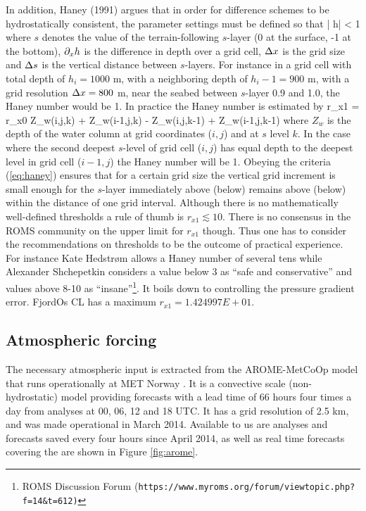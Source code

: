 In addition, Haney (1991) argues that in order for difference schemes to be hydrostatically
consistent, the parameter settings must be defined so that
\be
\label{eq:haney}
 \left|  \px h\right|\frac{\Dx}{\Ds} < 1
\ee
where $s$ denotes the value of the terrain-following $s$-layer (0 at the surface, -1 at the bottom), $\partial_x h$ is the difference in depth over a grid cell, $\Delta x$ is the grid size and $\Delta s$ is the vertical distance between $s$-layers. For instance in a grid cell with total depth of $h_i=1000$ m, with a neighboring depth of $h_i-1=900$ m, with a grid resolution $\Delta x=800$ m, near the seabed between $s$-layer 0.9 and 1.0, the Haney number would be 1. In practice the Haney number is estimated by
\be
 r_{x1} = r_{x0}
                     {Z_w(i,j,k) + Z_w(i-1,j,k) - Z_w(i,j,k-1) + Z_w(i-1,j,k-1)}
\ee
where $Z_w$ is the depth of the water column at grid coordinates ($i,j$) and at $s$ level $k$. In the case where the second deepest $s$-level of grid cell ($i,j$) has equal depth to the deepest level in grid cell ($i-1,j$) the Haney number will be 1. Obeying the criteria (\ref{eq:haney}) ensures that for a certain grid size the vertical grid increment is small enough for the $s$-layer immediately above (below) remains above (below) within the distance of one grid interval. Although there is no mathematically well-defined thresholds a rule of thumb is $r_{x1} \lesssim 10$. There is no consensus in the ROMS community on the upper limit for $r_{x1}$ though. Thus one has to consider the recommendations on thresholds to be the outcome of practical experience. For instance Kate Hedstr{\o}m allows a Haney number of several tens while Alexander Shchepetkin considers a value below 3 as ``safe and conservative'' and values above 8-10 as ``insane''\footnote{ROMS Discussion Forum (\texttt{https://www.myroms.org/forum/viewtopic.php?f=14\&t=612)}}. It boils down to controlling the pressure gradient error. FjordOs CL has a maximum $r_{x1} = 1.424997E+01$. %

\subsection{Atmospheric forcing}
\label{subsec:atmos}
The necessary atmospheric input is extracted from the AROME-MetCoOp model that runs operationally at MET Norway \citep{mulle:etal:2015}. It is a convective scale (non-hydrostatic) model providing forecasts with a lead time of 66 hours four times a day from analyses at 00, 06, 12 and 18 UTC. It has a grid resolution of 2.5 km, and was made operational in March 2014. Available to us are analyses and forecasts saved every four hours since April 2014, as well as real time forecasts covering the are shown in Figure \ref{fig:arome}.



